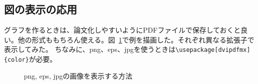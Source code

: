 \documentclass[a4j]{jsarticle}
\begin{document}
\subsection{図の表示の応用}

グラフを作るときは、論文化しやすいようにPDFファイルで保存しておくと良い。他の形式ももちろん使える。図~\ref{fig:various_img}で例を描画した。それぞれ異なる拡張子で表示してみた。
ちなみに、png、eps、jpgを使うときは\verb|\usepackage[dvipdfmx]{color}|が必要。

\begin{figure}[htbp]
\centering
{}
\caption{png, eps, jpgの画像を表示する方法\label{fig:various_img}}
\end{figure}
\end{document}
